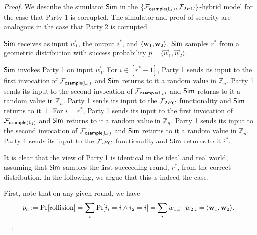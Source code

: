 \begin{proof}
We describe the simulator ${\mathsf{Sim}}$ in the $\{\mathcal{F}_{\mathsf{osample(L_1)}}, \mathcal{F}_{2PC} \}$-hybrid model
for the case that Party 1 is corrupted.
The simulator and proof of security are analogous in the case that Party 2 is corrupted.

${\mathsf{Sim}}$ receives as input
$\vec{w}_1$, the output $i^*$, and $\langle \mathbf{w}_1, \mathbf{w}_2 \rangle$.
${\mathsf{Sim}}$ samples $r^*$ from a geometric distribution with success probability $p = \langle
\vec{w}_1, \vec{w}_2 \rangle$.

${\mathsf{Sim}}$ invokes Party 1 on input $\vec{w}_1$.
For $i \in [r^*-1]$, 
Party 1 sends its input to the first
invocation of 
$\mathcal{F}_{\mathsf{osample(L_1)}}$ and ${\mathsf{Sim}}$
returns to it a random value in $\mathbb{Z}_n$.
Party 1 sends its input to the second
invocation of 
$\mathcal{F}_{\mathsf{osample(L_1)}}$ and ${\mathsf{Sim}}$
returns to it a random value in $\mathbb{Z}_n$.
Party 1 sends its input to the 
$\mathcal{F}_{2PC}$ functionality and ${\mathsf{Sim}}$
returns to it $\bot$.
For $i = r^*$,
Party 1 sends its input to the first
invocation of 
$\mathcal{F}_{\mathsf{osample(L_1)}}$ and ${\mathsf{Sim}}$
returns to it a random value in $\mathbb{Z}_n$.
Party 1 sends its input to the second
invocation of 
$\mathcal{F}_{\mathsf{osample(L_1)}}$ and ${\mathsf{Sim}}$
returns to it a random value in $\mathbb{Z}_n$.
Party 1 sends its input to the 
$\mathcal{F}_{2PC}$ functionality and ${\mathsf{Sim}}$
returns to it $i^*$.

It is clear that the view of Party 1
is identical in the ideal and real world,
assuming that ${\mathsf{Sim}}$
samples the first succeeding round,
$r^*$, from the correct distribution.
In the following, we argue that this is 
indeed the case.

First, note that on any given round, we have 
$$p_c := \Pr[\mbox{collision}] = \sum_i \Pr[i_i = i \wedge i_2 = i] = \sum_i w_{1,i} \cdot w_{2,i} = \langle \mathbf{w}_1, \mathbf{w}_2 \rangle.$$ 



\end{proof}
